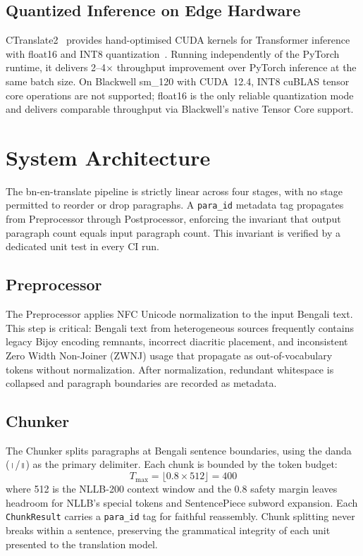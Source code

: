 \documentclass[sigconf]{acmart}
\begin{document}
\subsection{Quantized Inference on Edge Hardware}

CTranslate2~\cite{ctranslate2_klein} provides hand-optimised CUDA kernels for
Transformer inference with float16 and INT8 quantization~\cite{dettmers2022llmint8}.
Running independently of the PyTorch~\cite{pytorch2024} runtime, it delivers
2--4$\times$ throughput improvement over PyTorch inference at the same batch
size.
On Blackwell sm\_120 with CUDA~12.4, INT8 cuBLAS tensor core operations are
not supported; float16 is the only reliable quantization mode and delivers
comparable throughput via Blackwell's native Tensor Core support.

\section{System Architecture}

The bn-en-translate pipeline is strictly linear across four stages, with no
stage permitted to reorder or drop paragraphs.
A \texttt{para\_id} metadata tag propagates from Preprocessor through Postprocessor,
enforcing the invariant that output paragraph count equals input paragraph count.
This invariant is verified by a dedicated unit test in every CI run.

\subsection{Preprocessor}

The Preprocessor applies NFC Unicode normalization to the input Bengali text.
This step is critical: Bengali text from heterogeneous sources frequently contains
legacy Bijoy encoding remnants, incorrect diacritic placement, and inconsistent
Zero Width Non-Joiner (ZWNJ) usage that propagate as out-of-vocabulary tokens
without normalization.
After normalization, redundant whitespace is collapsed and paragraph boundaries
are recorded as metadata.

\subsection{Chunker}

The Chunker splits paragraphs at Bengali sentence boundaries, using the danda
(\texttt{।}/\texttt{॥}) as the primary delimiter.
Each chunk is bounded by the token budget:
\begin{equation}
  T_{\max} = \lfloor 0.8 \times 512 \rfloor = 400
\end{equation}
where 512 is the NLLB-200 context window and the 0.8 safety margin leaves headroom
for NLLB's special tokens and SentencePiece subword expansion.
Each \texttt{ChunkResult} carries a \texttt{para\_id} tag for faithful reassembly.
Chunk splitting never breaks within a sentence, preserving the grammatical integrity
of each unit presented to the translation model.
\end{document}
